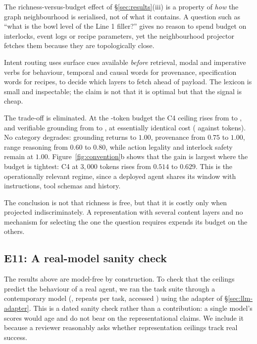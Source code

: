 The richness-versus-budget effect of \S\ref{sec:results}(iii) is a property of
\emph{how} the graph neighbourhood is serialised, not of what it contains. A
question such as ``what is the bowl level of the Line 1 filler?'' gives no
reason to spend budget on interlocks, event logs or recipe parameters, yet the
neighbourhood projector fetches them because they are topologically close.

Intent routing uses surface cues available \emph{before} retrieval, modal and
imperative verbs for behaviour, temporal and causal words for provenance,
specification words for recipes, to decide which layers to fetch ahead of
payload. The lexicon is small and inspectable; the claim is not that it is
optimal but that the signal is cheap.

The trade-off is eliminated. At the \TokenBudget-token budget the C4 ceiling rises
from \RouteCFourNeighCeiling{} to \RouteCFourRoutedCeiling{}, and verifiable
grounding from \RouteCFourNeighVerif{} to \RouteCFourRoutedVerif{}, at
essentially identical cost (\RouteCFourNeighTokens{} against
\RouteCFourRoutedTokens{} tokens). No category degrades: grounding returns to
$1.00$, provenance from $0.75$ to $1.00$, range reasoning from $0.60$ to
$0.80$, while action legality and interlock safety remain at $1.00$.
Figure~\ref{fig:convention}b shows that the gain is largest where the budget is
tightest: C4 at $3{,}000$ tokens rises from $0.514$ to $0.629$. This is the
operationally relevant regime, since a deployed agent shares its window with
instructions, tool schemas and history.

The conclusion is not that richness is free, but that it is costly only when
projected indiscriminately. A representation with several content layers and no
mechanism for selecting the one the question requires expends its budget on the
others.

\subsection{E11: A real-model sanity check}
\label{sec:e11}



The results above are model-free by construction. To check that the ceilings
predict the behaviour of a real agent, we ran the task suite through a
contemporary model (\texttt{\EllModel}, \EllRepeats{} repeats per task, accessed
\EllDate) using the adapter of \S\ref{sec:llm-adapter}. This is a dated sanity
check rather than a contribution: a single model's scores would age and do not
bear on the representational claims. We include it because a reviewer reasonably
asks whether representation ceilings track real success.

